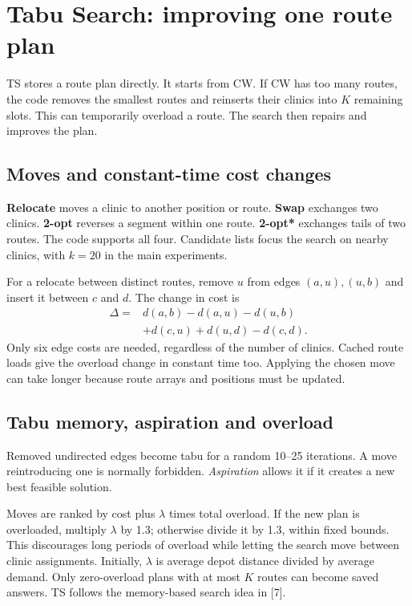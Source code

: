 \section{Tabu Search: improving one route plan}
TS stores a route plan directly. It starts from CW. If CW has too many routes, the code
removes the smallest routes and reinserts their clinics into $K$ remaining slots. This can
temporarily overload a route. The search then repairs and improves the plan.

\subsection*{Moves and constant-time cost changes}
\textbf{Relocate} moves a clinic to another position or route. \textbf{Swap} exchanges two clinics.
\textbf{2-opt} reverses a segment within one route. \textbf{2-opt*} exchanges tails of two routes.
The code supports all four. Candidate lists focus the search on nearby clinics, with $k=20$
in the main experiments.

For a relocate between distinct routes, remove $u$ from edges $(a,u),(u,b)$ and insert it between
$c$ and $d$. The change in cost is
\[
\begin{split}
 \Delta={}&d(a,b)-d(a,u)-d(u,b)\\
          &+d(c,u)+d(u,d)-d(c,d).
\end{split}
\]
Only six edge costs are needed, regardless of the number of clinics. Cached route loads give
the overload change in constant time too. Applying the chosen move can take longer because
route arrays and positions must be updated.

\subsection*{Tabu memory, aspiration and overload}
Removed undirected edges become tabu for a random 10--25 iterations. A move reintroducing
one is normally forbidden. \emph{Aspiration} allows it if it creates a new best feasible solution.

Moves are ranked by cost plus $\lambda$ times total overload. If the new plan is overloaded,
multiply $\lambda$ by 1.3; otherwise divide it by 1.3, within fixed bounds. This discourages
long periods of overload while letting the search move between clinic assignments. Initially,
$\lambda$ is average depot distance divided by average demand. Only zero-overload plans with
at most $K$ routes can become saved answers. TS follows the memory-based search idea in [7].

